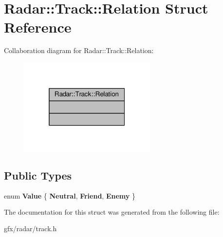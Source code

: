 \hypertarget{structRadar_1_1Track_1_1Relation}{}\section{Radar\+:\+:Track\+:\+:Relation Struct Reference}
\label{structRadar_1_1Track_1_1Relation}


Collaboration diagram for Radar\+:\+:Track\+:\+:Relation\+:
\nopagebreak
\begin{figure}[H]
\begin{center}
\leavevmode
\includegraphics[width=196pt]{d4/d3b/structRadar_1_1Track_1_1Relation__coll__graph}
\end{center}
\end{figure}
\subsection*{Public Types}
\begin{DoxyCompactItemize}
\item 
enum {\bfseries Value} \{ {\bfseries Neutral}, 
{\bfseries Friend}, 
{\bfseries Enemy}
 \}\hypertarget{structRadar_1_1Track_1_1Relation_a9682e49df52492ad5959a45627d6b011}{}\label{structRadar_1_1Track_1_1Relation_a9682e49df52492ad5959a45627d6b011}

\end{DoxyCompactItemize}


The documentation for this struct was generated from the following file\+:\begin{DoxyCompactItemize}
\item 
gfx/radar/track.\+h\end{DoxyCompactItemize}
